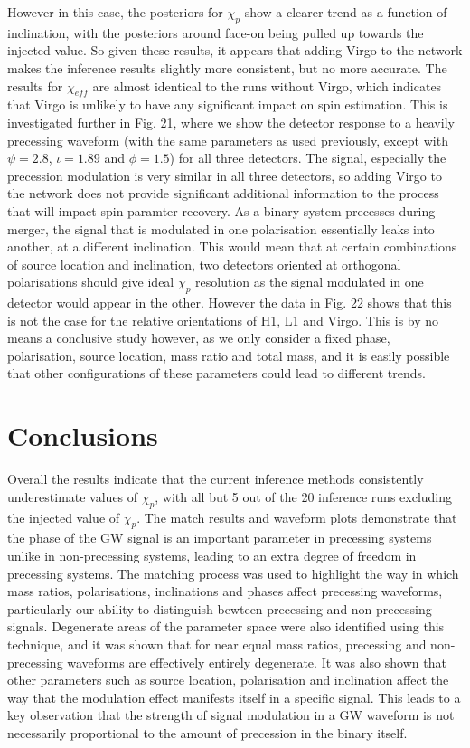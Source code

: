\documentclass[11pt]{article}
\begin{document}
However in this case, the posteriors for $\chi_p$ show a clearer trend as a function of inclination, with the posteriors around face-on being pulled up towards the injected value. So given these results, it appears that adding Virgo to the network makes the inference results slightly more consistent, but no more accurate. The results for $\chi_{eff}$ are almost identical to the runs without Virgo, which indicates that Virgo is unlikely to have any significant impact on spin estimation.
This is investigated further in Fig. 21, where we show the detector response to a heavily precessing waveform (with the same parameters as used previously, except with $\psi=2.8$, $\iota=1.89$ and $\phi=1.5$) for all three detectors. The signal, especially the precession modulation is very similar in all three detectors, so adding Virgo to the network does not provide significant additional information to the process that will impact spin paramter recovery. As a binary system precesses during merger, the signal that is modulated in one polarisation essentially leaks into another, at a different inclination. This would mean that at certain combinations of source location and inclination, two detectors oriented at orthogonal polarisations should give ideal $\chi_p$ resolution as the signal modulated in one detector would appear in the other. However the data in Fig. 22 shows that this is not the case for the relative orientations of H1, L1 and Virgo. This is by no means a conclusive study however, as we only consider a fixed phase, polarisation, source location, mass ratio and total mass, and it is easily possible that other configurations of these parameters could lead to different trends.

\section{Conclusions}
Overall the results indicate that the current inference methods consistently underestimate values of $\chi_p$, with all but 5 out of the 20 inference runs excluding the injected value of $\chi_p$. The match results and waveform plots demonstrate that the phase of the GW signal is an important parameter in precessing systems unlike in non-precessing systems, leading to an extra degree of freedom in precessing systems. The matching process was used to highlight the way in which mass ratios, polarisations, inclinations and phases affect precessing waveforms, particularly our ability to distinguish bewteen precessing and non-precessing signals. Degenerate areas of the parameter space were also identified using this technique, and it was shown that for near equal mass ratios, precessing and non-precessing waveforms are effectively entirely degenerate. It was also shown that other parameters such as source location, polarisation and inclination affect the way that the modulation effect manifests itself in a specific signal. This leads to a key observation that the strength of signal modulation in a GW waveform is not necessarily proportional to the amount of precession in the binary itself.
\end{document}
